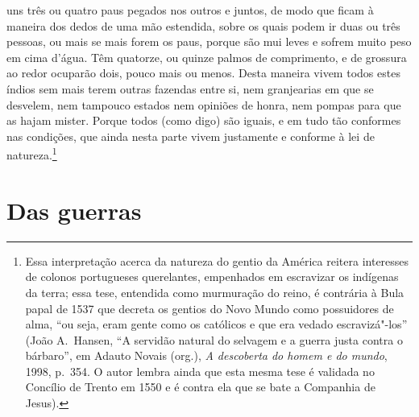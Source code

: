 uns três ou quatro paus pegados nos outros e juntos, de modo que ficam
à maneira dos dedos de uma mão estendida, sobre os quais podem ir duas
ou três pessoas, ou mais se mais forem os paus, porque são mui leves e
sofrem muito peso em cima d'água. Têm quatorze, ou
quinze palmos de comprimento, e de grossura ao redor ocuparão dois, pouco
mais ou menos. Desta maneira vivem todos estes índios sem mais terem			%
outras fazendas entre si, nem granjearias em que se desvelem, nem tampouco
estados nem opiniões de honra, nem pompas para que as hajam
mister. Porque todos (como digo) são iguais, e em tudo tão conformes
nas condições, que ainda nesta parte vivem justamente e conforme à lei		 \vspace*{-\baselineskip}
de natureza.\footnote{ Essa interpretação acerca da natureza do 
gentio da América reitera interesses de colonos portugueses querelantes,
empenhados em escravizar os indígenas da terra; essa tese, entendida como
murmuração do reino, é contrária à Bula papal de 1537 que decreta os gentios do
Novo Mundo como possuidores de alma, ``ou seja, eram gente como os católicos e
que era vedado escravizá"-los'' (João A.~Hansen, ``A servidão natural do selvagem e a guerra  
justa contra o bárbaro'', em Adauto Novais (org.), \textit{A descoberta do homem e do mundo}, 1998, p.~354. O autor lembra ainda que esta mesma tese é validada no  
Concílio de Trento em 1550 e é contra ela que se bate a Companhia de Jesus).} 		%


\chapter[Das guerras]{Das guerras}						  


